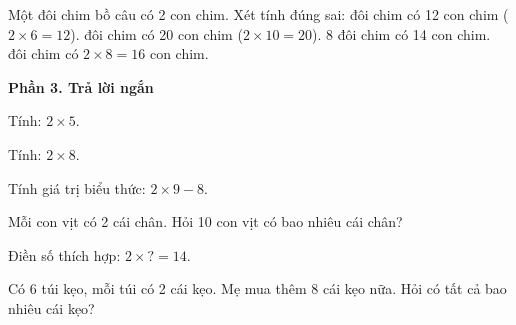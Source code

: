 \begin{ex} %
Một đôi chim bồ câu có 2 con chim. Xét tính đúng sai:
\choiceTF
{ đôi chim có 12 con chim ($2 \times 6 = 12$).}
{ đôi chim có 20 con chim ($2 \times 10 = 20$).}
{8 đôi chim có 14 con chim.}
{ đôi chim có $2 \times 8 = 16$ con chim.}
\end{ex}

\textbf{Phần 3. Trả lời ngắn}

\begin{ex} %
Tính: $2 \times 5$.
\end{ex}

\begin{ex} %
Tính: $2 \times 8$.
\end{ex}

\begin{ex} %
Tính giá trị biểu thức: $2 \times 9 - 8$.
\end{ex}

\begin{ex} %
Mỗi con vịt có 2 cái chân. Hỏi 10 con vịt có bao nhiêu cái chân?
\end{ex}

\begin{ex} %
Điền số thích hợp: $2 \times ? = 14$.
\end{ex}

\begin{ex} %
Có 6 túi kẹo, mỗi túi có 2 cái kẹo. Mẹ mua thêm 8 cái kẹo nữa. Hỏi có tất cả bao nhiêu cái kẹo?
\end{ex}
